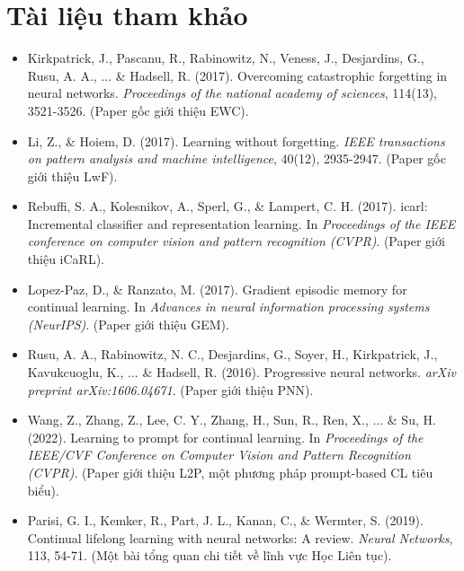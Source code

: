 \section*{Tài liệu tham khảo}
\begin{itemize}
	\item[1] Kirkpatrick, J., Pascanu, R., Rabinowitz, N., Veness, J., Desjardins, G., Rusu, A. A., ... \& Hadsell, R. (2017). Overcoming catastrophic forgetting in neural networks. \textit{Proceedings of the national academy of sciences}, 114(13), 3521-3526. (Paper gốc giới thiệu EWC).
	\item[2] Li, Z., \& Hoiem, D. (2017). Learning without forgetting. \textit{IEEE transactions on pattern analysis and machine intelligence}, 40(12), 2935-2947. (Paper gốc giới thiệu LwF).
	\item[3] Rebuffi, S. A., Kolesnikov, A., Sperl, G., \& Lampert, C. H. (2017). icarl: Incremental classifier and representation learning. In \textit{Proceedings of the IEEE conference on computer vision and pattern recognition (CVPR)}. (Paper giới thiệu iCaRL).
	\item[4] Lopez-Paz, D., \& Ranzato, M. (2017). Gradient episodic memory for continual learning. In \textit{Advances in neural information processing systems (NeurIPS)}. (Paper giới thiệu GEM).
	\item[5] Rusu, A. A., Rabinowitz, N. C., Desjardins, G., Soyer, H., Kirkpatrick, J., Kavukcuoglu, K., ... \& Hadsell, R. (2016). Progressive neural networks. \textit{arXiv preprint arXiv:1606.04671}. (Paper giới thiệu PNN).
	\item[6] Wang, Z., Zhang, Z., Lee, C. Y., Zhang, H., Sun, R., Ren, X., ... \& Su, H. (2022). Learning to prompt for continual learning. In \textit{Proceedings of the IEEE/CVF Conference on Computer Vision and Pattern Recognition (CVPR)}. (Paper giới thiệu L2P, một phương pháp prompt-based CL tiêu biểu).
	\item[7] Parisi, G. I., Kemker, R., Part, J. L., Kanan, C., \& Wermter, S. (2019). Continual lifelong learning with neural networks: A review. \textit{Neural Networks}, 113, 54-71. (Một bài tổng quan chi tiết về lĩnh vực Học Liên tục).
\end{itemize}
